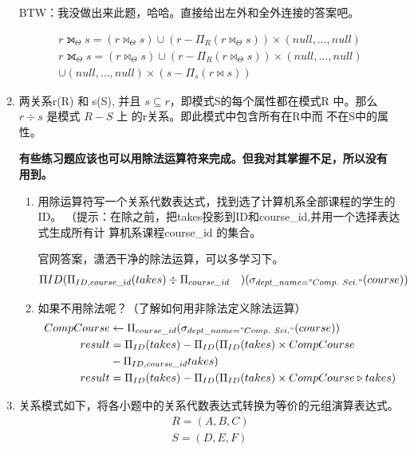 \documentclass{dingjia}
\begin{document}
\begin{enumerate}
  BTW：我没做出来此题，哈哈。直接给出左外和全外连接的答案吧。

  \begin{gather*}
    r ⟕_ { \Theta} s = (r \bowtie_{\Theta} s) \cup (r - \Pi_R(r \bowtie_{\Theta}s)) \times
    (null, \ldots , null) \\
    r ⟗_{\Theta} s = (r \bowtie_{\Theta} s) \cup (r - \Pi_R(r \bowtie_{\Theta} s)) \times
    (null, \ldots , null) \\
    \cup (null, \ldots , null) \times (s - \Pi_s(r \bowtie s))
  \end{gather*}

\item 两关系r(R) 和 s(S), 并且 $s \subseteq r$，即模式S的每个属性都在模式R
  中。那么 $r \div s$ 是模式 $R - S$ 上  的r关系。即此模式中包含所有在R中而
  不在S中的属性。

  \textbf{有些练习题应该也可以用除法运算符来完成。但我对其掌握不足，所以没有
    用到。}

  \begin{enumerate}
  \item 用除运算符写一个关系代数表达式，找到选了计算机系全部课程的学生的ID。
    （提示：在除之前，把takes投影到ID和course\_id,并用一个选择表达式生成所有计
    算机系课程course\_id 的集合。

    官网答案，潇洒干净的除法运算，可以多学习下。
    \begin{align*}
      \Pi{ID}(\Pi_{ID, course\_id}& (takes) \div
                                   \Pi_{course\_id}& )(\sigma_{dept\_name="Comp.\ Sci."}(course))
    \end{align*}

  \item 如果不用除法呢？（了解如何用非除法定义除法运算）
    \begin{align*}
      CompCourse & \leftarrow \Pi_{ course\_id}(\sigma_{dept\_name = "Comp.\ Sci."}(course)) \\
      result & = \Pi_{ID}(takes) - \Pi_{ID}( \Pi_{ID}(takes) \times CompCourse\\
                                & - \Pi_{ID, course\_id}takes)\\
      result & = \Pi_{ID}(takes) -  \Pi_{ID}(\Pi_{ID}(takes) \times CompCourse \triangleright takes)
    \end{align*}

  \end{enumerate}

\item 关系模式如下，将各小题中的关系代数表达式转换为等价的元组演算表达式。
  \begin{gather*}
    R=(A,B,C) \\
    S=(D,E,F)
  \end{gather*}


\end{enumerate}
\end{document}
